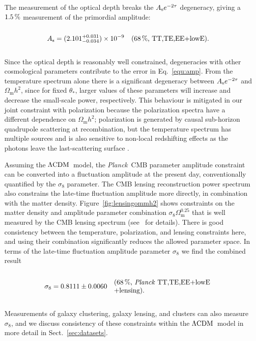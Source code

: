 \documentclass[longauth,traditabstract]{aa}
\def\Planck{\textit{Planck}}
\def\,{\thinspace}
\newcommand{\leftparbox}[2]{\parbox{#1}{\begin{flushleft} #2 \end{flushleft}}}
\newcommand{\oneonesig}[4][5cm]{
\begin{equation}
\left.
  #2 \quad\mbox{\text{\leftparbox{#1}{(68\,\%,~#3)#4}}}
  \right.
\end{equation}
}
\newcommand{\mksym}[1]{\ifmmode {\rm #1}\else #1\fi}
\newcommand{\dataplus}{\allowbreak+}
\newcommand{\lensing}{\mksym{lensing}}
\newcommand{\TTTEEE}{\mksym{TT,TE,EE}}
\newcommand{\planckTTTEEEonly}{\planck\ \TTTEEE}
\newcommand{\lowE}{\mksym{lowE}}
\newcommand{\planckall}{\planckTTTEEEonly\dataplus\lowE}
\newcommand{\planckalllensing}{\planckall\dataplus\lensing}
\newcommand{\shortall}{\TTTEEE\dataplus\lowE}
\newcommand{\As}{A_{\rm s}}
\newcommand{\lcdm}{\texorpdfstring{{$\rm{\Lambda CDM}$}}{ΛCDM}}
\providecommand{\text}[1]{\rm{#1}}
\providecommand{\Omm}{\Omega_{\mathrm{m}}}
\newcommand{\PlanckLensTwo}{\citetalias{planck2014-a17}}
\newcommand{\planck}{\Planck}
\begin{document}
The measurement of the optical depth breaks the $\As e^{-2\tau}$ degeneracy, giving a $1.5\,\%$ measurement of the primordial amplitude:
\oneonesig[4cm]{\As = (2.101^{+0.031}_{-0.034})\times 10^{-9}}{\shortall}{. \label{equ:amp}}
Since the optical depth is reasonably well constrained, degeneracies with other
cosmological parameters contribute to the error in Eq.~\eqref{equ:amp}.
 From the temperature spectrum alone there is a significant degeneracy between $\As e^{-2\tau}$ and $\Omm h^2$, since for fixed $\theta_*$,
larger values of these parameters will increase and decrease the small-scale power, respectively.
This behaviour is mitigated in our joint constraint with polarization because the polarization spectra have a different dependence on $\Omm h^2$; polarization is generated by causal sub-horizon quadrupole scattering at recombination, but the temperature spectrum has multiple sources and is also sensitive to non-local redshifting effects as the photons leave the last-scattering surface \citep[see, e.g.,][for further discussion]{Galli:2014kla}.

Assuming the \lcdm\ model, the \planck\ CMB parameter amplitude constraint can be converted into a fluctuation amplitude at the present day,
conventionally quantified by the $\sigma_8$ parameter.
The CMB lensing reconstruction power spectrum also constrains the late-time fluctuation amplitude more directly, in combination with the matter density.
Figure~\ref{fig:lensingommh2} shows constraints on the matter density and amplitude parameter combination $\sigma_8 \Omm^{0.25}$ that is well measured by the CMB lensing spectrum (see \PlanckLensTwo\ for details).
There is good consistency between the temperature, polarization, and lensing constraints here, and using their combination significantly reduces the allowed parameter space. In terms of the late-time fluctuation amplitude parameter $\sigma_8$ we find the combined result
\oneonesig{\sigma_8=0.8111 \pm 0.0060}{\planckalllensing}{.}
Measurements of galaxy clustering, galaxy lensing, and clusters can also measure $\sigma_8$, and we discuss consistency of these constraints within the \lcdm\ model in more detail in Sect.~\ref{sec:datasets}.
\end{document}
